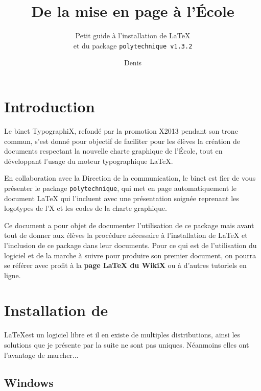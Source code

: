 \documentclass[a4paper,12pt,twoside]{article}
\title{De la mise en page à l'École}
\subtitle{Petit guide à l'installation de \textrm{\LaTeX}\\et du package \textup{\texttt{polytechnique v1.3.2}}}
\author{Denis \bsc{Merigoux}}
\begin{document}
\maketitle

\section{Introduction}

Le binet TypographiX, refondé par la promotion X2013 pendant son tronc commun, s'est donné pour objectif de faciliter pour les élèves la création de documents respectant la nouvelle charte graphique de l'École, tout en développant l'usage du moteur typographique \LaTeX.

En collaboration avec la Direction de la communication, le binet est fier de vous présenter le package \texttt{polytechnique}, qui met en page automatiquement le document \LaTeX{} qui l'incluent avec une présentation soignée reprenant les logotypes de l'X et les codes de la charte graphique.

Ce document a pour objet de documenter l'utilisation de ce package mais avant tout de donner aux élèves la procédure nécessaire à l'installation de \LaTeX{} et l'inclusion de ce package dans leur documents. Pour ce qui est de l'utilisation du logiciel et de la marche à suivre pour produire son premier document, on pourra se référer avec profit à la \textbf{page LaTeX du WikiX} ou à d'autres tutoriels en ligne.

\section{Installation de \rmfamily{\LaTeX}}

\LaTeX est un logiciel libre et il en existe de multiples distributions, ainsi les solutions que je présente par la suite ne sont pas uniques. Néanmoins elles ont l'avantage de marcher...

\subsection{Windows}
\end{document}
